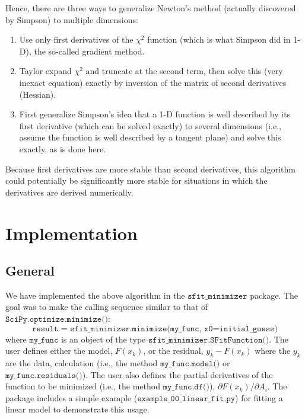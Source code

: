 \documentclass[preprint]{aastex631}
\newcommand{\minimize}{$\texttt{SciPy.optimize.minimize()}$}
\begin{document}
Hence, there are three ways to generalize Newton's method (actually discovered by Simpson)
to multiple dimensions:
\begin{enumerate}
\item{Use only first derivatives of the $\chi^2$ function (which is what Simpson did in
   1-D), the so-called gradient method.}
\item{Taylor expand $\chi^2$ and truncate at the second term, then
   solve this (very inexact equation) exactly by inversion
   of the matrix of second derivatives (Hessian).}
\item{First generalize Simpson's idea that a 1-D function is well
   described by its first derivative (which can be solved
   exactly) to several dimensions (i.e., assume the function is well
   described by a tangent plane) and solve this exactly, as is done here.}
\end{enumerate}

Because first derivatives are more stable than second derivatives, this algorithm could potentially be significantly more stable for situations in which the derivatives are derived numerically.

\section{Implementation}

\subsection{General}

We have implemented the above algorithm in the $\texttt{sfit\_minimizer}$ package. The goal was to make the calling sequence similar to that of \minimize:
\begin{equation}
\texttt{result = sfit\_minimizer.minimize(my\_func, x0=initial\_guess)}
\end{equation}
where $\texttt{my\_func}$ is an object of the type $\texttt{sfit\_minimizer.SFitFunction()}$. The user defines either the model, $F(x_k)$, or the residual, $y_k - F(x_k)$ where the $y_k$ are the data, calculation (i.e., the method $\texttt{my\_func.model()}$ or $\texttt{my\_func.residuals()}$). The user also defines
 the partial derivatives of the function to be minimized (i.e., the method $\texttt{my\_func.df()}$), $\partial F(x_k) / \partial A_i$. The package includes a simple example ($\texttt{example\_00\_linear\_fit.py}$) for fitting a linear model to demonstrate this usage.
\end{document}
